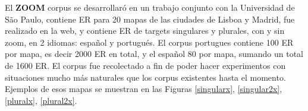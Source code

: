 \label{sec:corpusZOOM}
El {\bf ZOOM} corpus se desarrollar\'o en un trabajo conjunto con la Universidad de S\~ao Paulo, contiene ER para 20 mapas de las ciudades de Lisboa y Madrid, fue realizado en la web, y contiene ER de targets singulares y plurales, con y sin zoom, en 2 idiomas: espa\~nol y portugu\'es. El corpus portugues contiene 100 ER por mapa, es decir 2000 ER en total, y el espa\~nol 80 por mapa, sumando un total de 1600 ER. El corpus fue recolectado a fin de poder hacer experimentos con situaciones mucho m\'as naturales que los corpus existentes hasta el momento. Ejemplos de esos mapas se muestran en las Figuras \ref{singularx}, \ref{singular2x}, \ref{pluralx}, \ref{plural2x}.


